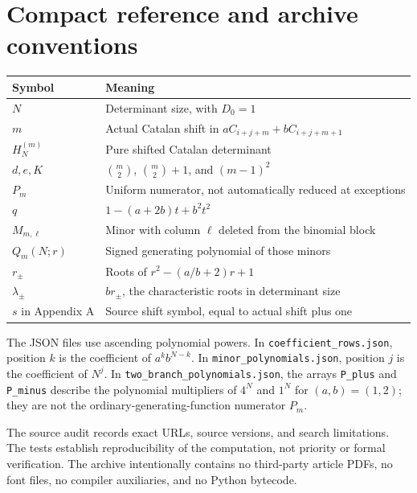 \documentclass[11pt,a4paper]{article}
\numberwithin{equation}{section}
\theoremstyle{definition}
\theoremstyle{remark}
\begin{document}
\section{Compact reference and archive conventions}\label{app:reference}

\begin{center}
\renewcommand{\arraystretch}{1.25}
\begin{tabular}{@{}p{}p{}@{}}
\toprule
Symbol & Meaning\\
\midrule
$N$ & Determinant size, with $D_0=1$\\
$m$ & Actual Catalan shift in $aC_{i+j+m}+bC_{i+j+m+1}$\\
$H_N^{(m)}$ & Pure shifted Catalan determinant\\
$d,e,K$ & $\binom m2$, $\binom m2+1$, and $(m-1)^2$\\
$P_m$ & Uniform numerator, not automatically reduced at exceptions\\
$q$ & $1-(a+2b)t+b^2t^2$\\
$M_{m,\ell}$ & Minor with column $\ell$ deleted from the binomial block\\
$Q_m(N;r)$ & Signed generating polynomial of those minors\\
$r_\pm$ & Roots of $r^2-(a/b+2)r+1$\\
$\lambda_\pm$ & $br_\pm$, the characteristic roots in determinant size\\
$s$ in Appendix A & Source shift symbol, equal to actual shift plus one\\
\bottomrule
\end{tabular}
\end{center}

The JSON files use ascending polynomial powers.  In
\texttt{coefficient\_rows.json}, position $k$ is the coefficient of
$a^kb^{N-k}$.  In \texttt{minor\_polynomials.json}, position $j$ is the
coefficient of $N^j$.  In \texttt{two\_branch\_polynomials.json}, the
arrays \texttt{P\_plus} and \texttt{P\_minus} describe the polynomial
multipliers of $4^N$ and $1^N$ for $(a,b)=(1,2)$; they are not the
ordinary-generating-function numerator $P_m$.

The source audit records exact URLs, source versions, and search
limitations.  The tests establish reproducibility of the computation,
not priority or formal verification.  The archive intentionally contains
no third-party article PDFs, no font files, no compiler auxiliaries,
and no Python bytecode.
\end{document}
